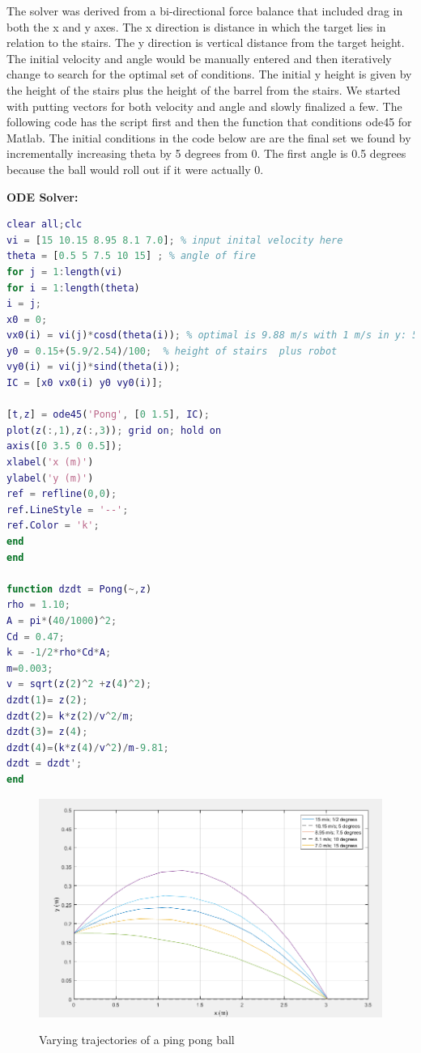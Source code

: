 \documentclass[12pt,letterpaper,titlepage]{article}
\begin{document}
The solver was derived from a bi-directional force balance that included drag in both the x and y axes. The x direction is distance in which the target lies in relation to the stairs. The y direction is vertical distance from the target height. The initial velocity and angle would be manually entered and then iteratively change to search for the optimal set of conditions. The initial y height is given by the height of the stairs plus the height of the barrel from the stairs. We started with putting vectors for both velocity and angle and slowly finalized a few. The following code has the script first and then the function that conditions ode45 for Matlab. The initial conditions in the code below are are the final set we found by incrementally increasing theta by 5 degrees from 0. The first angle is 0.5 degrees because the ball would roll out if it were actually 0. 


\bigskip\noindent\textbf{ODE Solver:}

\begin{lstlisting}[language=matlab]
clear all;clc
vi = [15 10.15 8.95 8.1 7.0]; % input inital velocity here
theta = [0.5 5 7.5 10 15] ; % angle of fire
for j = 1:length(vi)
for i = 1:length(theta)
i = j;
x0 = 0;
vx0(i) = vi(j)*cosd(theta(i)); % optimal is 9.88 m/s with 1 m/s in y: 5 degree angle
y0 = 0.15+(5.9/2.54)/100;  % height of stairs  plus robot
vy0(i) = vi(j)*sind(theta(i));
IC = [x0 vx0(i) y0 vy0(i)];

[t,z] = ode45('Pong', [0 1.5], IC);
plot(z(:,1),z(:,3)); grid on; hold on
axis([0 3.5 0 0.5]);
xlabel('x (m)')
ylabel('y (m)')
ref = refline(0,0);
ref.LineStyle = '--';
ref.Color = 'k';
end
end

function dzdt = Pong(~,z)
rho = 1.10;
A = pi*(40/1000)^2;
Cd = 0.47;
k = -1/2*rho*Cd*A;
m=0.003;
v = sqrt(z(2)^2 +z(4)^2);
dzdt(1)= z(2);
dzdt(2)= k*z(2)/v^2/m;
dzdt(3)= z(4);
dzdt(4)=(k*z(4)/v^2)/m-9.81;
dzdt = dzdt';
end
\end{lstlisting}
\bigskip
\bigskip

\begin{figure}[H]
	\centering
	\includegraphics[width=\textwidth]{images/ODE}
	\label{fig:ODE}
	\caption{Varying trajectories of a ping pong ball}
\end{figure}
\end{document}
